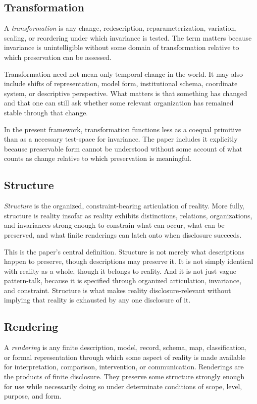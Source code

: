 \documentclass[11pt]{article}
\renewcommand{\emph}[1]{\textit{#1}}
\begin{document}
\subsection{Transformation}

A \emph{transformation} is any change, redescription, reparameterization, variation, scaling, or reordering under which invariance is tested. The term matters because invariance is unintelligible without some domain of transformation relative to which preservation can be assessed.

Transformation need not mean only temporal change in the world. It may also include shifts of representation, model form, institutional schema, coordinate system, or descriptive perspective. What matters is that something has changed and that one can still ask whether some relevant organization has remained stable through that change.

In the present framework, transformation functions less as a coequal primitive than as a necessary test-space for invariance. The paper includes it explicitly because preservable form cannot be understood without some account of what counts as change relative to which preservation is meaningful.

\subsection{Structure}

\emph{Structure} is the organized, constraint-bearing articulation of reality. More fully, structure is reality insofar as reality exhibits distinctions, relations, organizations, and invariances strong enough to constrain what can occur, what can be preserved, and what finite renderings can latch onto when disclosure succeeds.

This is the paper's central definition. Structure is not merely what descriptions happen to preserve, though descriptions may preserve it. It is not simply identical with reality as a whole, though it belongs to reality. And it is not just vague pattern-talk, because it is specified through organized articulation, invariance, and constraint. Structure is what makes reality disclosure-relevant without implying that reality is exhausted by any one disclosure of it.

\subsection{Rendering}

A \emph{rendering} is any finite description, model, record, schema, map, classification, or formal representation through which some aspect of reality is made available for interpretation, comparison, intervention, or communication. Renderings are the products of finite disclosure. They preserve some structure strongly enough for use while necessarily doing so under determinate conditions of scope, level, purpose, and form. \cite{FriggNguyen2021ScientificRepresentationSEP,FriggHartmann2025ModelsScienceSEP}
\end{document}
